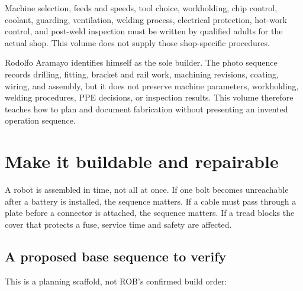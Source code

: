 \documentclass[11pt,openany]{book}
\begin{document}
\begin{safetybox}[title={MILLING AND WELDING ARE NOT CHILD ACTIVITIES}]
Machine selection, feeds and speeds, tool choice, workholding, chip control, coolant, guarding, ventilation, welding process, electrical protection, hot-work control, and post-weld inspection must be written by qualified adults for the actual shop. This volume does not supply those shop-specific procedures.
\end{safetybox}

\begin{fieldnotebox}[title={FABRICATION MEMORY IS NOT A SHOP TRAVELER}]
Rodolfo Aramayo identifies himself as the sole builder. The photo sequence records drilling, fitting, bracket and rail work, machining revisions, coating, wiring, and assembly, but it does not preserve machine parameters, workholding, welding procedures, PPE decisions, or inspection results. This volume therefore teaches how to plan and document fabrication without presenting an invented operation sequence.
\end{fieldnotebox}



\chapter{Make it buildable and repairable}

A robot is assembled in time, not all at once. If one bolt becomes unreachable after a battery is installed, the sequence matters. If a cable must pass through a plate before a connector is attached, the sequence matters. If a tread blocks the cover that protects a fuse, service time and safety are affected.

\section*{A proposed base sequence to verify}

This is a planning scaffold, not ROB's confirmed build order:
\end{document}
